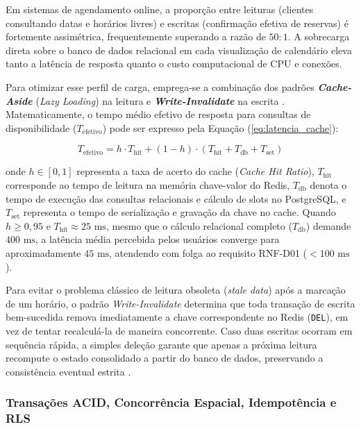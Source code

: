 \documentclass[12pt,a4paper]{article}
\begin{document}
Em sistemas de agendamento online, a proporção entre leituras (clientes consultando datas e horários livres) e escritas (confirmação efetiva de reservas) é fortemente assimétrica, frequentemente superando a razão de $50:1$. A sobrecarga direta sobre o banco de dados relacional em cada visualização de calendário eleva tanto a latência de resposta quanto o custo computacional de CPU e conexões.

Para otimizar esse perfil de carga, emprega-se a combinação dos padrões \textbf{\textit{Cache-Aside}} (\textit{Lazy Loading}) na leitura e \textbf{\textit{Write-Invalidate}} na escrita \cite{redis_invalidation, medium_caching_essentials}. Matematicamente, o tempo médio efetivo de resposta para consultas de disponibilidade ($T_{\text{efetivo}}$) pode ser expresso pela Equação (\ref{eq:latencia_cache}):

\begin{equation}
T_{\text{efetivo}} = h \cdot T_{\text{hit}} + (1 - h) \cdot \left( T_{\text{hit}} + T_{\text{db}} + T_{\text{set}} \right)
\label{eq:latencia_cache}
\end{equation}

\noindent onde $h \in [0, 1]$ representa a taxa de acerto do cache (\textit{Cache Hit Ratio}), $T_{\text{hit}}$ corresponde ao tempo de leitura na memória chave-valor do Redis, $T_{\text{db}}$ denota o tempo de execução das consultas relacionais e cálculo de slots no PostgreSQL, e $T_{\text{set}}$ representa o tempo de serialização e gravação da chave no cache. Quando $h \ge 0{,}95$ e $T_{\text{hit}} \approx 25\text{ ms}$, mesmo que o cálculo relacional completo ($T_{\text{db}}$) demande $400\text{ ms}$, a latência média percebida pelos usuários converge para aproximadamente $45\text{ ms}$, atendendo com folga ao requisito RNF-D01 ($< 100\text{ ms}$).

Para evitar o problema clássico de leitura obsoleta (\textit{stale data}) após a marcação de um horário, o padrão \textit{Write-Invalidate} determina que toda transação de escrita bem-sucedida remova imediatamente a chave correspondente no Redis (\texttt{DEL}), em vez de tentar recalculá-la de maneira concorrente. Caso duas escritas ocorram em sequência rápida, a simples deleção garante que apenas a próxima leitura recompute o estado consolidado a partir do banco de dados, preservando a consistência eventual estrita \cite{kleppmann2017}.

\subsubsection{Transações ACID, Concorrência Espacial, Idempotência e RLS}
\label{subsubsec:acid_rls}
\end{document}
